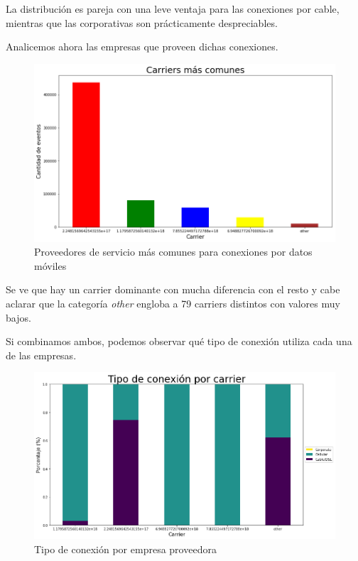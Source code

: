 \documentclass[a4paper, 12pt]{article}
\begin{document}
		La distribución es pareja con una leve ventaja para las conexiones por cable, mientras que las corporativas son prácticamente despreciables.
		
		Analicemos ahora las empresas que proveen dichas conexiones.
		
		\FloatBarrier
		\begin{figure}[h]
			\centering
			\includegraphics[width=\textwidth]{images/events/carriers.png}
			\caption{Proveedores de servicio más comunes para conexiones por datos móviles}
		\end{figure}
		\FloatBarrier
	
		Se ve que hay un carrier dominante con mucha diferencia con el resto y cabe aclarar que la categoría \textit{other} engloba a 79 carriers distintos con valores muy bajos.
		
		Si combinamos ambos, podemos observar qué tipo de conexión utiliza cada una de las empresas.
		
		\FloatBarrier
		\begin{figure}[h]
			\centering
			\includegraphics[width=\textwidth]{images/events/carriersxtipo.png}
			\caption{Tipo de conexión por empresa proveedora}
		\end{figure}
		\FloatBarrier
		
\end{document}
